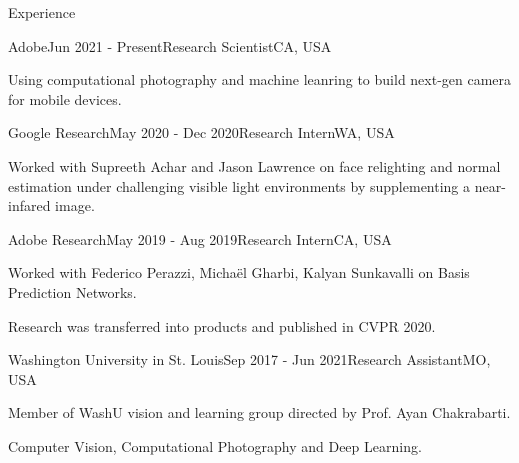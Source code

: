 \documentclass{resume} %
\begin{document}
\begin{rSection}{Experience}


\begin{rSubsection}{Adobe}{Jun 2021 - Present}{Research Scientist}{CA, USA}
\item Using computational photography and machine leanring to build next-gen camera for mobile devices.

\end{rSubsection}



\begin{rSubsection}{Google Research}{May 2020 - Dec 2020}{Research Intern}{WA, USA}
\item Worked with Supreeth Achar and Jason Lawrence on face relighting and normal estimation under challenging visible light environments by supplementing a near-infared image.

\end{rSubsection}


\begin{rSubsection}{Adobe Research}{May 2019 - Aug 2019}{Research Intern}{CA, USA}
\item Worked with Federico Perazzi, Micha\"el Gharbi, Kalyan Sunkavalli on Basis Prediction Networks.
\item Research was transferred into products and published in CVPR 2020.

\end{rSubsection}

\begin{rSubsection}{Washington University in St. Louis}{Sep 2017 - Jun 2021}{Research Assistant}{MO, USA}
\item Member of WashU vision and learning group directed by Prof. Ayan Chakrabarti.
\item Computer Vision, Computational Photography and Deep Learning.
\end{rSubsection}



\end{rSection}
\end{document}
